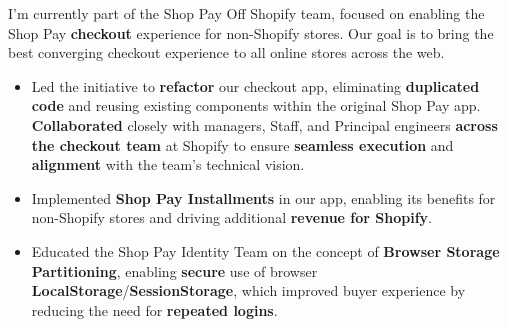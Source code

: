 I'm currently part of the Shop Pay Off Shopify team, focused on enabling the Shop Pay \textbf{checkout} experience for non-Shopify stores. Our goal is to bring the best converging checkout experience to all online stores across the web.
\medskip
\begin{itemize}
    \item Led the initiative to \textbf{refactor} our checkout app, eliminating \textbf{duplicated code} and reusing existing components within the original Shop Pay app. \textbf{Collaborated} closely with managers, Staff, and Principal engineers \textbf{across the checkout team} at Shopify to ensure \textbf{seamless execution} and \textbf{alignment} with the team's technical vision.
    \item Implemented \textbf{Shop Pay Installments} in our app, enabling its benefits for non-Shopify stores and driving additional \textbf{revenue for Shopify}.
    \item Educated the Shop Pay Identity Team on the concept of \textbf{Browser Storage Partitioning}, enabling \textbf{secure} use of browser \textbf{LocalStorage}/\textbf{SessionStorage}, which improved buyer experience by reducing the need for \textbf{repeated logins}.
\end{itemize}
